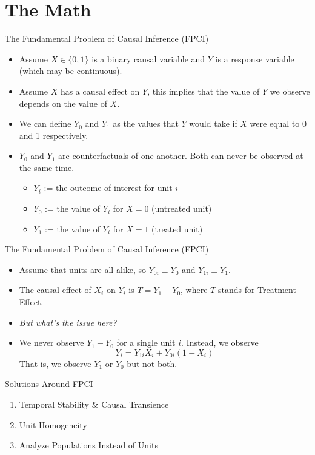 \documentclass{beamer}
\begin{document}
\section{The Math}

\begin{frame}{The Fundamental Problem of Causal Inference (FPCI)}
  \begin{itemize}
    \item<+-> Assume $X \in\{0,1\}$ is a binary causal variable and $Y$ is a response variable (which may be continuous).
    \item<+-> Assume $X$ has a causal effect on $Y$, this implies that the value of $Y$ we observe depends on the value of $X$.
    \item<+-> We can define $Y_0$ and $Y_1$ as the values that $Y$ would take if $X$ were equal to 0 and 1 respectively.
    \item<+-> $Y_0$ and $Y_1$ are counterfactuals of one another. Both can never be observed at the same time.
    \begin{itemize}
      \item $Y_i$ := the outcome of interest for unit $i$
      \item $Y_0$ := the value of $Y_i$ for $X=0$ (untreated unit)
      \item $Y_1$ := the value of $Y_i$ for $X=1$ (treated unit)
    \end{itemize}
  \end{itemize}
\end{frame}

\begin{frame}{The Fundamental Problem of Causal Inference (FPCI)}
  \begin{itemize}
    \item<+-> Assume that units are all alike, so $Y_{0 i} \equiv Y_0$ and $Y_{1 i} \equiv Y_1$.
    \item<+-> The causal effect of $X_i$ on $Y_i$ is $T=Y_1-Y_0$, where $T$ stands for Treatment Effect.
    \item<+-> \textit{But what's the issue here?}
    \item<+-> We never observe $Y_1-Y_0$ for a single unit $i$. Instead, we observe
    $$
    Y_i=Y_{1 i} X_i+Y_{0 i}\left(1-X_i\right)
    $$
    That is, we observe $Y_1$ or $Y_0$ but not both.
  \end{itemize}
\end{frame}

\begin{frame}{Solutions Around FPCI}
  \begin{enumerate}
    \item<+-> Temporal Stability \& Causal Transience
    \item<+-> Unit Homogeneity
    \item<+-> Analyze Populations Instead of Units
  \end{enumerate}
\end{frame}
\end{document}

